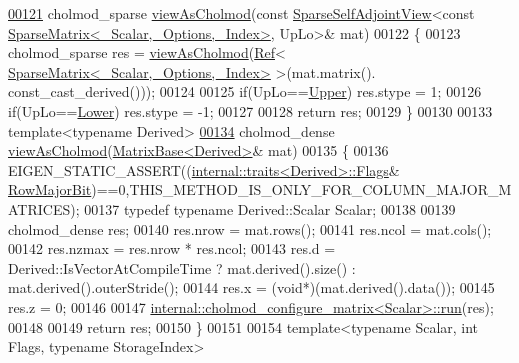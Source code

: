 \begin{DoxyCode}
\hyperlink{namespace_eigen_afacb818b18280e2e1ab73836ab74cab5}{00121} cholmod\_sparse \hyperlink{namespace_eigen_ac9fb9e40cfc9ddbdc7da84ee01bb7545}{viewAsCholmod}(\textcolor{keyword}{const} \hyperlink{group___sparse_core___module_class_eigen_1_1_sparse_self_adjoint_view}{SparseSelfAdjointView}<\textcolor{keyword}{const} 
      \hyperlink{group___sparse_core___module_class_eigen_1_1_sparse_matrix}{SparseMatrix<\_Scalar,\_Options,\_Index>}, UpLo>& mat)
00122 \{
00123   cholmod\_sparse res = \hyperlink{namespace_eigen_ac9fb9e40cfc9ddbdc7da84ee01bb7545}{viewAsCholmod}(\hyperlink{group___core___module_class_eigen_1_1_ref}{Ref}<
      \hyperlink{group___sparse_core___module_class_eigen_1_1_sparse_matrix}{SparseMatrix<\_Scalar,\_Options,\_Index>} >(mat.matrix().
      const\_cast\_derived()));
00124   
00125   \textcolor{keywordflow}{if}(UpLo==\hyperlink{group__enums_gga39e3366ff5554d731e7dc8bb642f83cda6bcb58be3b8b8ec84859ce0c5ac0aaec}{Upper}) res.stype =  1;
00126   \textcolor{keywordflow}{if}(UpLo==\hyperlink{group__enums_gga39e3366ff5554d731e7dc8bb642f83cda891792b8ed394f7607ab16dd716f60e6}{Lower}) res.stype = -1;
00127 
00128   \textcolor{keywordflow}{return} res;
00129 \}
00130 
00133 \textcolor{keyword}{template}<\textcolor{keyword}{typename} Derived>
\hyperlink{namespace_eigen_a92fe7b595099051fa1d1c443641a6de3}{00134} cholmod\_dense \hyperlink{namespace_eigen_ac9fb9e40cfc9ddbdc7da84ee01bb7545}{viewAsCholmod}(\hyperlink{group___core___module_class_eigen_1_1_matrix_base}{MatrixBase<Derived>}& mat)
00135 \{
00136   EIGEN\_STATIC\_ASSERT((\hyperlink{struct_eigen_1_1internal_1_1traits}{internal::traits<Derived>::Flags}&
      \hyperlink{group__flags_gae4f56c2a60bbe4bd2e44c5b19cbe8762}{RowMajorBit})==0,THIS\_METHOD\_IS\_ONLY\_FOR\_COLUMN\_MAJOR\_MATRICES);
00137   \textcolor{keyword}{typedef} \textcolor{keyword}{typename} Derived::Scalar Scalar;
00138 
00139   cholmod\_dense res;
00140   res.nrow   = mat.rows();
00141   res.ncol   = mat.cols();
00142   res.nzmax  = res.nrow * res.ncol;
00143   res.d      = Derived::IsVectorAtCompileTime ? mat.derived().size() : mat.derived().outerStride();
00144   res.x      = (\textcolor{keywordtype}{void}*)(mat.derived().data());
00145   res.z      = 0;
00146 
00147   \hyperlink{struct_eigen_1_1internal_1_1cholmod__configure__matrix}{internal::cholmod\_configure\_matrix<Scalar>::run}(res);
00148 
00149   \textcolor{keywordflow}{return} res;
00150 \}
00151 
00154 \textcolor{keyword}{template}<\textcolor{keyword}{typename} Scalar, \textcolor{keywordtype}{int} Flags, \textcolor{keyword}{typename} StorageIndex>

\end{DoxyCode}
